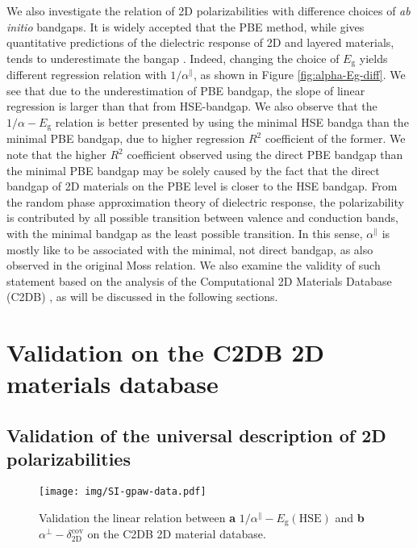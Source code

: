 \documentclass[manuscript=suppinfo,email=true,hyperref=true,keywords=false]{achemso}
\begin{document}
We also investigate the relation of 2D polarizabilities with
difference choices of \textit{ab initio} bandgaps. It is widely
accepted that the PBE method, while gives quantitative predictions of
the dielectric response of 2D and layered materials, tends to
underestimate the bangap
\cite{Kumar_2016_PRB,Kumar_2016_jpcc}.   Indeed, changing the choice of $E_{\mathrm{g}}$ yields
different regression relation with $1/\alpha^{\parallel}$, as shown in
Figure \ref{fig:alpha-Eg-diff}. We see that due to the underestimation
of PBE bandgap, the slope of linear regression is larger than that
from HSE-bandgap. We also observe that the $1/\alpha-E_{\mathrm{g}}$
relation is better presented by using the minimal HSE bandga than the
minimal PBE bandgap, due to higher regression $R^{2}$ coefficient of
the former. We note that the higher $R^{2}$ coefficient observed using
the direct PBE bandgap than the minimal PBE bandgap may be solely
caused by the fact that the direct bandgap of 2D materials on the PBE
level is closer to the HSE bandgap. From the random phase
approximation theory of dielectric response, the polarizability is
contributed by all possible transition between valence and conduction
bands, with the minimal bandgap as the least possible transition. In
this sense, $\alpha^{\parallel}$ is mostly like to be associated with
the minimal, not direct bandgap, as also observed in the original Moss
relation. We also examine the validity of such statement based on the
analysis of the Computational 2D Materials Database (C2DB)
\cite{Haastrup_2018}, as will be discussed in the following sections.








\section{Validation on the C2DB 2D materials database}
\label{sec:gpaw}
\subsection{Validation of the universal description of 2D polarizabilities}
\label{sec:gpaw-1}

\begin{figure}[htbp]
  \centering
  \texttt{[image: img/SI-gpaw-data.pdf]}
  \caption{Validation the linear relation between \textbf{a}
    $1/\alpha^{\parallel}-E_{\mathrm{g}}(\mathrm{HSE})$ and \textbf{b}
    $\alpha^{\perp}-\delta_{\mathrm{2D}}^{\mathrm{cov}}$ on the C2DB
    2D material database. }
  \label{fig:gpaw-alpha-relation}
\end{figure}
\end{document}

